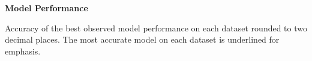 
\begin{table*}[htbp]
    \renewcommand{\familydefault}{\sfdefault}\normalfont
    \centering
    \caption{\bf Model Performance}

    \begin{tableminipage}{\textwidth}

        

        \label{tab:model-comparison}
        \footnotesize  
        \raggedright

        Accuracy of the best observed model performance on each dataset
        rounded to two decimal places. The most accurate model on 
        each dataset is underlined for emphasis. 
        

    \end{tableminipage}
\end{table*}
